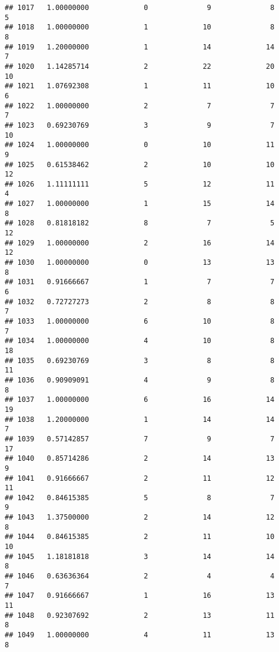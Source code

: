 \documentclass[
]{article}
\begin{document}
\begin{verbatim}
## 1017   1.00000000             0              9              8              5
## 1018   1.00000000             1             10              8              8
## 1019   1.20000000             1             14             14              7
## 1020   1.14285714             2             22             20             10
## 1021   1.07692308             1             11             10              6
## 1022   1.00000000             2              7              7              7
## 1023   0.69230769             3              9              7             10
## 1024   1.00000000             0             10             11              9
## 1025   0.61538462             2             10             10             12
## 1026   1.11111111             5             12             11              4
## 1027   1.00000000             1             15             14              8
## 1028   0.81818182             8              7              5             12
## 1029   1.00000000             2             16             14             12
## 1030   1.00000000             0             13             13              8
## 1031   0.91666667             1              7              7              6
## 1032   0.72727273             2              8              8              7
## 1033   1.00000000             6             10              8              7
## 1034   1.00000000             4             10              8             18
## 1035   0.69230769             3              8              8             11
## 1036   0.90909091             4              9              8              8
## 1037   1.00000000             6             16             14             19
## 1038   1.20000000             1             14             14              7
## 1039   0.57142857             7              9              7             17
## 1040   0.85714286             2             14             13              9
## 1041   0.91666667             2             11             12             11
## 1042   0.84615385             5              8              7              9
## 1043   1.37500000             2             14             12              8
## 1044   0.84615385             2             11             10             10
## 1045   1.18181818             3             14             14              8
## 1046   0.63636364             2              4              4              7
## 1047   0.91666667             1             16             13             11
## 1048   0.92307692             2             13             11              8
## 1049   1.00000000             4             11             13              8

\end{verbatim}
\end{document}
